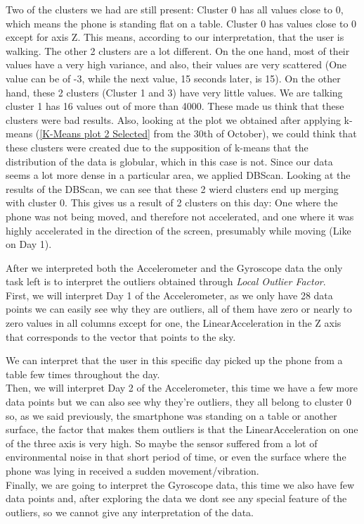 \documentclass[idxtotoc,hyperref,openany]{labbook} %
\begin{document}
Two of the clusters we had are still present: Cluster 0 has all values close to 0, which means the phone is standing flat on a table. Cluster 0 has values close to 0 except for axis Z. This means, according to our interpretation, that the user is walking. The other 2 clusters are a lot different. On the one hand, most of their values have a very high variance, and also, their values are very scattered (One value can be of -3, while the next value, 15 seconds later, is 15). On the other hand, these 2 clusters (Cluster 1 and 3) have very little values. We are talking cluster 1 has 16 values out of more than 4000. These made us think that these clusters were bad results. Also, looking at the plot we obtained after applying k-means (\ref{K-Means plot 2 Selected} from the 30th of October), we could think that these clusters were created due to the supposition of k-means that the distribution of the data is globular, which in this case is not. Since our data seems a lot more dense in a particular area, we applied DBScan. Looking at the results of the DBScan, we can see that these 2 wierd clusters end up merging with cluster 0. This gives us a result of 2 clusters on this day: One where the phone was not being moved, and therefore not accelerated, and one where it was highly accelerated in the direction of the screen, presumably while moving (Like on Day 1).




After we interpreted both the Accelerometer and the Gyroscope data the only task left is to interpret the outliers obtained through \textit{Local Outlier Factor}.
\\

First, we will interpret Day 1 of the Accelerometer, as we only have 28 data points we can easily see why they are outliers, all of them have zero or nearly to zero values in all columns except for one, the LinearAcceleration in the Z axis that corresponds to the vector that points to the sky.


We can interpret that the user in this specific day picked up the phone from a table few times throughout the day.
\\

Then, we will interpret Day 2 of the Accelerometer, this time we have a few more data points but we can also see why they're outliers, they all belong to cluster 0 so, as we said previously, the smartphone was standing on a table or another surface, the factor that makes them outliers is that the LinearAcceleration on one of the three axis is very high. So maybe the sensor suffered from a lot of environmental noise in that short period of time, or even the surface where the phone was lying in received a sudden movement/vibration.
\\

Finally, we are going to interpret the Gyroscope data, this time we also have few data points and, after exploring the data we dont see any special feature of the outliers, so we cannot give any interpretation of the data.
\end{document}
